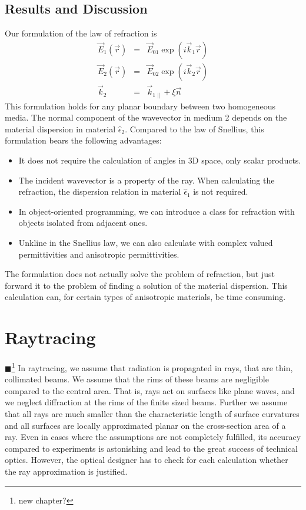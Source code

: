 \documentclass[12pt,a4paper,twoside,openright,BCOR10mm,headsepline,titlepage,abstracton,chapterprefix,final]{scrreprt}
\newcommand\Location{\Vector{r}}
\newcommand\wavenumber{k}
\newcommand\Wavevector{\Vector{\wavenumber}}
\newcommand\Vector[1]{\vec{#1}}
\newcommand\Tensor[1]{\hat{#1}}
\newcommand\scalarEfield{E}
\newcommand\Efield{\Vector{\scalarEfield}}
\newcommand\permittivity{\Tensor{\epsilon}}
\newcommand{\remark}[1]{{\color{red}$\blacksquare$}\footnote{{\color{red}#1}}}
\begin{document}
\subsection{Results and Discussion}
Our formulation of the law of refraction is
\begin{eqnarray}
 \Efield_1(\Location) &=& \Efield_{01} \exp(i \Wavevector_1 \Location) \\
 \Efield_2(\Location) &=& \Efield_{02} \exp(i \Wavevector_2 \Location) \\
 \Wavevector_{2} &=& \Wavevector_{1\parallel} + \xi \vec{n}
\end{eqnarray}
This formulation holds for any planar boundary between two homogeneous media. The normal component of the wavevector in medium 2 depends on the material dispersion in material $\permittivity_2$.
Compared to the law of Snellius, this formulation bears the following advantages:
\begin{itemize}
 \item It does not require the calculation of angles in 3D space, only scalar products.
 \item The incident wavevector is a property of the ray. When calculating the refraction, the dispersion relation in material $\permittivity_1$ is not required.
 \item In object-oriented programming, we can introduce a class for refraction with objects isolated from adjacent ones.
 \item Unkline in the Snellius law, we can also calculate with complex valued permittivities and anisotropic permittivities.
\end{itemize}
The formulation does not actually solve the problem of refraction, but just forward it to the problem of finding a solution of the material dispersion. 
This calculation can, for certain types of anisotropic materials, be time consuming.

\section{Raytracing}
\remark{new chapter?}
In raytracing, we assume that radiation is propagated in rays, that are thin, collimated beams. 
We assume that the rims of these beams are negligible compared to the central area. That is, rays act on surfaces like plane waves, and we neglect diffraction at the rims of the finite sized beams.
Further we assume that all rays are much smaller than the characteristic length of surface curvatures and all surfaces are locally approximated planar on the cross-section area of a ray.
Even in cases where the assumptions are not completely fulfilled, its accuracy compared to experiments is astonishing and lead to the great success of technical optics.
However, the optical designer has to check for each calculation whether the ray approximation is justified.
\end{document}
